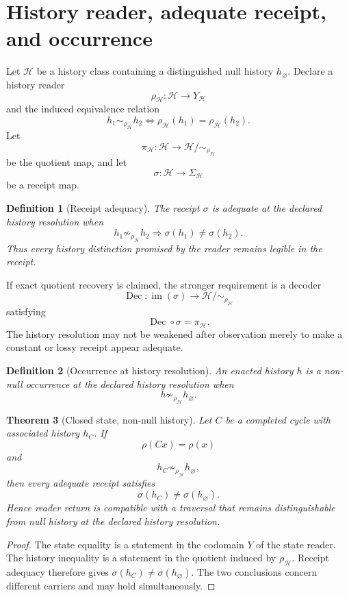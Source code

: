 \documentclass[11pt]{article}
\newtheorem{theorem}{Theorem}[section]
\newtheorem{definition}[theorem]{Definition}
\begin{document}
\section{History reader, adequate receipt, and occurrence}
Let $\mathcal H$ be a history class containing a distinguished null history $h_{\varnothing}$. Declare a history reader
\[
\rho_{\mathcal H}:\mathcal H\to Y_{\mathcal H}
\]
and the induced equivalence relation
\[
h_1\sim_{\rho_{\mathcal H}}h_2
\iff
\rho_{\mathcal H}(h_1)=\rho_{\mathcal H}(h_2).
\]
Let
\[
\pi_{\mathcal H}:\mathcal H\to \mathcal H/{\sim_{\rho_{\mathcal H}}}
\]
be the quotient map, and let
\[
\sigma:\mathcal H\to\Sigma_{\mathcal H}
\]
be a receipt map.

\begin{definition}[Receipt adequacy]
The receipt $\sigma$ is adequate at the declared history resolution when
\[
h_1\not\sim_{\rho_{\mathcal H}}h_2
\Longrightarrow
\sigma(h_1)\neq\sigma(h_2).
\]
Thus every history distinction promised by the reader remains legible in the receipt.
\end{definition}

If exact quotient recovery is claimed, the stronger requirement is a decoder
\[
\operatorname{Dec}:\operatorname{im}(\sigma)\to
\mathcal H/{\sim_{\rho_{\mathcal H}}}
\]
satisfying
\[
\operatorname{Dec}\circ\sigma=\pi_{\mathcal H}.
\]
The history resolution may not be weakened after observation merely to make a constant or lossy receipt appear adequate.

\begin{definition}[Occurrence at history resolution]
An enacted history $h$ is a non-null occurrence at the declared history resolution when
\[
h\not\sim_{\rho_{\mathcal H}}h_{\varnothing}.
\]
\end{definition}

\begin{theorem}[Closed state, non-null history]
Let $C$ be a completed cycle with associated history $h_C$. If
\[
\rho(Cx)=\rho(x)
\]
and
\[
h_C\not\sim_{\rho_{\mathcal H}}h_{\varnothing},
\]
then every adequate receipt satisfies
\[
\sigma(h_C)\neq\sigma(h_{\varnothing}).
\]
Hence reader return is compatible with a traversal that remains distinguishable from null history at the declared history resolution.
\end{theorem}
\begin{proof}
The state equality is a statement in the codomain $Y$ of the state reader. The history inequality is a statement in the quotient induced by $\rho_{\mathcal H}$. Receipt adequacy therefore gives $\sigma(h_C)\neq\sigma(h_{\varnothing})$. The two conclusions concern different carriers and may hold simultaneously.
\end{proof}
\end{document}
